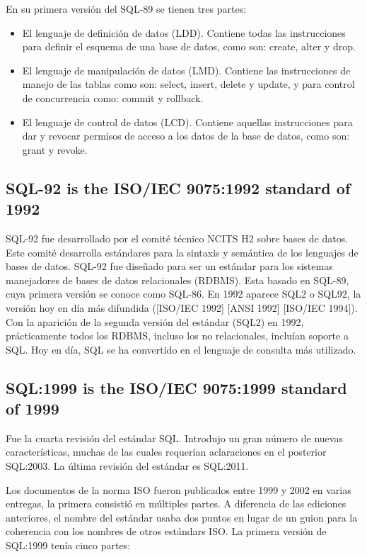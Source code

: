 \documentclass[twoside,twocolumn]{article}
\begin{document}
En su primera versión del SQL-89 se tienen tres partes:
\begin{itemize}	
	\item El lenguaje de definición de datos (LDD). Contiene todas las instrucciones para definir el esquema de una base de datos, como son: create, alter y drop.
	\item El lenguaje de manipulación de datos (LMD). Contiene las instrucciones de manejo de las tablas como son: select, insert, delete y update, y para control de concurrencia como: commit y rollback.
	\item El lenguaje de control de datos (LCD). Contiene aquellas instrucciones para dar y revocar permisos de acceso a los datos de la base de datos, como son: grant y revoke.
\end{itemize}

\subsection{SQL-92 is the ISO/IEC 9075:1992 standard of 1992}
SQL-92 fue desarrollado por el comité técnico NCITS H2 sobre bases de datos. Este comité desarrolla estándares para la sintaxis y semántica de los lenguajes de bases de datos. SQL-92 fue diseñado para ser un estándar para los sistemas manejadores de bases de datos relacionales (RDBMS). Esta basado en SQL-89, cuya primera versión se conoce como SQL-86. En 1992 aparece SQL2 o SQL92, la versión hoy en día más difundida ([ISO/IEC 1992] [ANSI 1992] [ISO/IEC 1994]). Con la aparición de la segunda versión del estándar (SQL2) en 1992, prácticamente todos los RDBMS, incluso los no relacionales, incluían soporte a SQL. Hoy en día, SQL se ha convertido en el lenguaje de consulta más utilizado.

\subsection{SQL:1999 is the ISO/IEC 9075:1999 standard of 1999}
 Fue la cuarta revisión del estándar SQL. Introdujo un gran número de nuevas características, muchas de las cuales requerían aclaraciones en el posterior SQL:2003. La última revisión del estándar es SQL:2011.
 
 Los documentos de la norma ISO fueron publicados entre 1999 y 2002 en varias entregas, la primera consistió en múltiples partes. A diferencia de las ediciones anteriores, el nombre del estándar usaba dos puntos en lugar de un guion para la coherencia con los nombres de otros estándars ISO. La primera versión de SQL:1999 tenía cinco partes:
\end{document}
